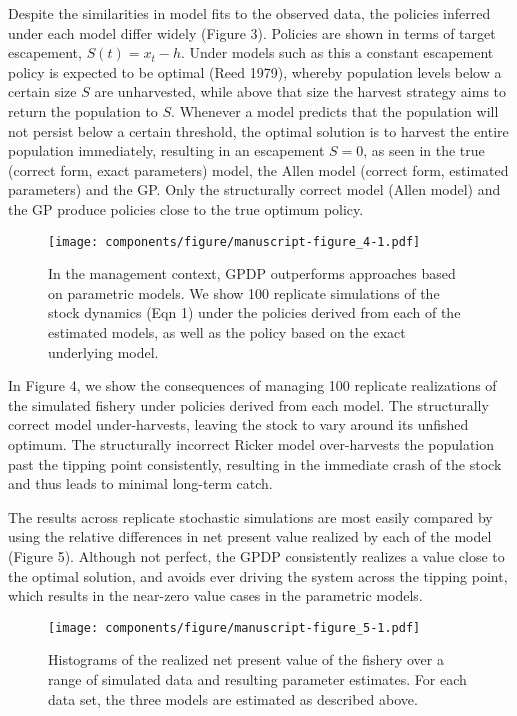 \documentclass[author-year, 12pt,review]{components/elsarticle} %
\makeatletter
\def\maxwidth{\ifdim\Gin@nat@width>\linewidth\linewidth
\else\Gin@nat@width\fi}
\let\Oldincludegraphics\includegraphics
\renewcommand{\includegraphics}[1]{\Oldincludegraphics[width=\maxwidth]{#1}}
\makeatother
\begin{document}
Despite the similarities in model fits to the observed data, the
policies inferred under each model differ widely (Figure 3). Policies
are shown in terms of target escapement, $S(t) = x_t - h$. Under models
such as this a constant escapement policy is expected to be optimal
(Reed 1979), whereby population levels below a certain size $S$ are
unharvested, while above that size the harvest strategy aims to return
the population to $S$. Whenever a model predicts that the population
will not persist below a certain threshold, the optimal solution is to
harvest the entire population immediately, resulting in an escapement
$S=0$, as seen in the true (correct form, exact parameters) model, the
Allen model (correct form, estimated parameters) and the GP. Only the
structurally correct model (Allen model) and the GP produce policies
close to the true optimum policy.

\begin{figure}[htbp]
\centering
\texttt{[image: components/figure/manuscript-figure\_4-1.pdf]}
\caption{In the management context, GPDP outperforms approaches based on
parametric models. We show 100 replicate simulations of the stock
dynamics (Eqn 1) under the policies derived from each of the estimated
models, as well as the policy based on the exact underlying model.}
\end{figure}

In Figure 4, we show the consequences of managing 100 replicate
realizations of the simulated fishery under policies derived from each
model. The structurally correct model under-harvests, leaving the stock
to vary around its unfished optimum. The structurally incorrect Ricker
model over-harvests the population past the tipping point consistently,
resulting in the immediate crash of the stock and thus leads to minimal
long-term catch.

The results across replicate stochastic simulations are most easily
compared by using the relative differences in net present value realized
by each of the model (Figure 5). Although not perfect, the GPDP
consistently realizes a value close to the optimal solution, and avoids
ever driving the system across the tipping point, which results in the
near-zero value cases in the parametric models.

\begin{figure}[htbp]
\centering
\texttt{[image: components/figure/manuscript-figure\_5-1.pdf]}
\caption{Histograms of the realized net present value of the fishery
over a range of simulated data and resulting parameter estimates. For
each data set, the three models are estimated as described above.}
\end{figure}
\end{document}
